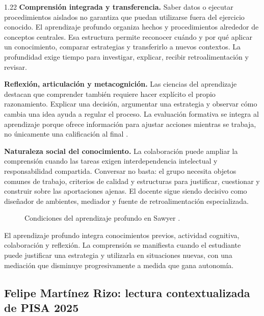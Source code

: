 \documentclass[spanish,letterpaper,oneside]{article}
\begin{document}
\begin{reportelecturabox}[title={Reporte de lectura 2: R. Keith Sawyer}]
\begin{spacing}{1.22}
\medskip\noindent\textbf{Comprensión integrada y transferencia.}\enspace
Saber datos o ejecutar procedimientos aislados no garantiza que puedan utilizarse fuera del ejercicio conocido. El aprendizaje profundo organiza hechos y procedimientos alrededor de conceptos centrales. Esa estructura permite reconocer cuándo y por qué aplicar un conocimiento, comparar estrategias y transferirlo a nuevos contextos. La profundidad exige tiempo para investigar, explicar, recibir retroalimentación y revisar.

\medskip\noindent\textbf{Reflexión, articulación y metacognición.}\enspace
Las ciencias del aprendizaje destacan que comprender también requiere hacer explícito el propio razonamiento. Explicar una decisión, argumentar una estrategia y observar cómo cambia una idea ayuda a regular el proceso. La evaluación formativa se integra al aprendizaje porque ofrece información para ajustar acciones mientras se trabaja, no únicamente una calificación al final \citep{sawyer2008optimizing}.

\medskip\noindent\textbf{Naturaleza social del conocimiento.}\enspace
La colaboración puede ampliar la comprensión cuando las tareas exigen interdependencia intelectual y responsabilidad compartida. Conversar no basta: el grupo necesita objetos comunes de trabajo, criterios de calidad y estructuras para justificar, cuestionar y construir sobre las aportaciones ajenas. El docente sigue siendo decisivo como diseñador de ambientes, mediador y fuente de retroalimentación especializada.
\end{spacing}
\end{reportelecturabox}

\begin{figure}[H]
\centering
\resizebox{\linewidth}{!}{\MapaSawyer}
\caption{Condiciones del aprendizaje profundo en Sawyer \citep{sawyer2008optimizing}.}
\label{fig:mapa-sawyer}
\end{figure}
El aprendizaje profundo integra conocimientos previos, actividad cognitiva, colaboración y reflexión. La comprensión se manifiesta cuando el estudiante puede justificar una estrategia y utilizarla en situaciones nuevas, con una mediación que disminuye progresivamente a medida que gana autonomía.

\subsection{Felipe Martínez Rizo: lectura contextualizada de PISA 2025}
\end{document}

